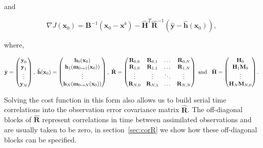 \documentclass[review]{elsarticle}
\begin{document}
and
\begin{linenomath}
\begin{equation}
\nabla J(\textbf{x}_0) = \textbf{B}^{-1}(\textbf{x}_0-\textbf{x}^b)-\hat{\mathbf{H}}^{T}\hat{\textbf{R}}^{-1}(\hat{\textbf{y}}-\hat{\textbf{h}}(\textbf{x}_0)), \label{gradcostfn}
\end{equation}
\end{linenomath}
where,
\begin{linenomath}
\begin{equation}
\hat{\textbf{y}}=
\begin{pmatrix}
\textbf{y}_0 \\
\textbf{y}_1\\
\vdots \\
\textbf{y}_N
\end{pmatrix},
\hspace{1mm}
\hat{\textbf{h}}(\textbf{x}_0)=
\begin{pmatrix}
\textbf{h}_0(\textbf{x}_0) \\
\textbf{h}_1(\textbf{m}_{0\rightarrow 1}(\mathbf{x}_{0}))\\
\vdots \\
\textbf{h}_N(\textbf{m}_{0\rightarrow N}(\mathbf{x}_{0}))
\end{pmatrix},
\hspace{1mm}
\hat{\mathbf{R}}=
\begin{pmatrix}
\mathbf{R}_{0, 0} & \mathbf{R}_{0, 1} & \dots & \mathbf{R}_{0, N} \\
\mathbf{R}_{1, 0} & \mathbf{R}_{1, 1} & \dots & \mathbf{R}_{1, N} \\
\vdots & \vdots & \ddots & \vdots \\
\mathbf{R}_{N, 0} & \mathbf{R}_{N, 1} & \dots & \mathbf{R}_{N, N}
\end{pmatrix}
\hspace{1mm} \text{and} \hspace{3mm}
\hat{\mathbf{H}}=
\begin{pmatrix}
\mathbf{H}_0 \\
\mathbf{H}_1\mathbf{M}_0\\
\vdots \\
\mathbf{H}_N\mathbf{M}_{N,0}
\end{pmatrix}.
\end{equation}
\end{linenomath}

Solving the cost function in this form also allows us to build serial time correlations into the observation error covariance matrix $\hat{\mathbf{R}}$. The off-diagonal blocks of $\hat{\mathbf{R}}$ represent correlations in time between assimilated observations and are usually taken to be zero, in section~\ref{sec:corR} we show how these off-diagonal blocks can be specified.
\end{document}

